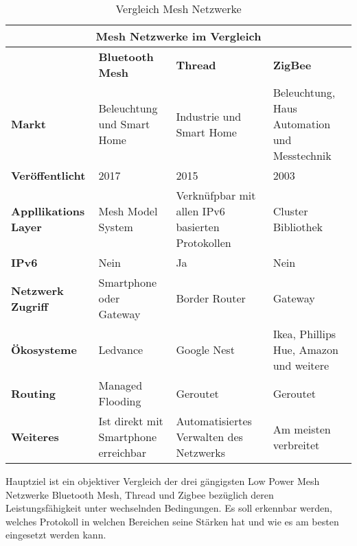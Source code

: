 \begin{table}[h]
	\centering
	\begin{adjustbox}{width=1\textwidth}
	\begin{tabular}{@{}|l|l|l|l|@{}}
		\toprule
		\multicolumn{4}{|c|}{\textbf{Mesh Netzwerke im Vergleich}}                                                                                                            \\ \midrule
		& \textbf{Bluetooth Mesh}              & \textbf{Thread}                                  & \textbf{ZigBee}                              \\ \midrule
		\textbf{Markt}               & Beleuchtung und Smart Home           & Industrie und Smart Home                         & Beleuchtung, Haus Automation und Messtechnik \\ \midrule
		\textbf{Veröffentlicht}      & 2017                                 & 2015                                             & 2003                                         \\ \midrule
		\textbf{Appllikations Layer} & Mesh Model System                    & Verknüfpbar mit allen IPv6 basierten Protokollen & Cluster Bibliothek                           \\ \midrule
		\textbf{IPv6}                & Nein                                 & Ja                                               & Nein                                         \\ \midrule
		\textbf{Netzwerk Zugriff}    & Smartphone oder Gateway              & Border Router                                    & Gateway                                      \\ \midrule
		\textbf{Ökosysteme}          & Ledvance                             & Google Nest                                      & Ikea, Phillips Hue, Amazon und weitere       \\ \midrule
		\textbf{Routing}             & Managed Flooding                     & Geroutet                                         & Geroutet                                     \\ \midrule
		\textbf{Weiteres}            & Ist direkt mit Smartphone erreichbar & Automatisiertes Verwalten des Netzwerks          & Am meisten verbreitet                        \\ \bottomrule
	\end{tabular}
	\end{adjustbox}
	\caption{Vergleich Mesh Netzwerke}\label{table:VergleichMeshNetzwerk}
\end{table}

Hauptziel ist ein objektiver Vergleich der drei gängigsten Low Power Mesh Netzwerke Bluetooth Mesh, Thread und Zigbee bezüglich deren Leistungsfähigkeit unter wechselnden Bedingungen. Es soll erkennbar werden, welches Protokoll in welchen Bereichen seine Stärken hat und wie es am besten eingesetzt werden kann.